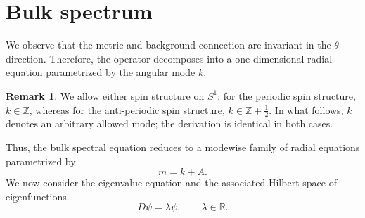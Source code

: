 \documentclass[11pt]{article}
\theoremstyle{definition}
\newtheorem{remark}[remark]{Remark}
\numberwithin{equation}{section}
\begin{document}
\section{Bulk spectrum}\label{sec:bulk}
We observe that the metric and background connection are invariant in the \(\theta\)-direction. Therefore, the operator decomposes into a one-dimensional radial equation parametrized by the angular mode \(k\). 

\begin{remark} \label{remark:spin_structure}
We allow either spin structure on \(S^1\): for the periodic spin structure, \(k\in\mathbb Z\), whereas for the anti-periodic spin structure, \(k\in\mathbb Z+\tfrac12\). In what follows, \(k\) denotes an arbitrary allowed mode; the derivation is identical in both cases.
\end{remark}

Thus, the bulk spectral equation reduces to a modewise family of radial equations parametrized by
\begin{equation}
m=k+A.
\end{equation}
We now consider the eigenvalue equation and the associated Hilbert space of eigenfunctions.
\begin{equation}
D\psi=\lambda\psi,
\qquad
\lambda\in\mathbb R.
\end{equation}
\end{document}
